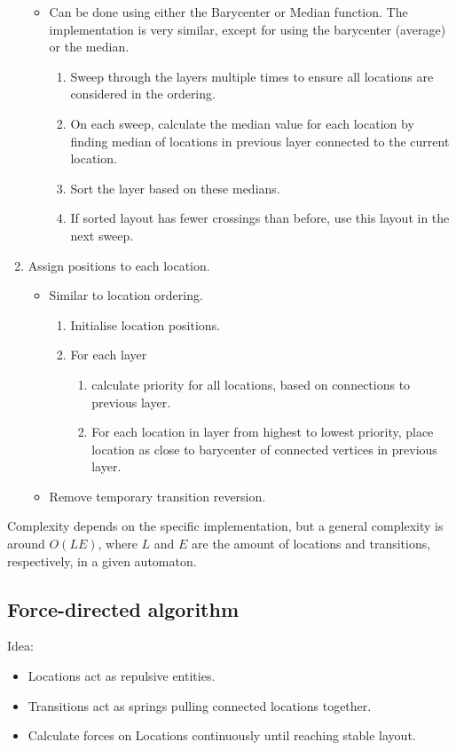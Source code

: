 \begin{enumerate}
\begin{itemize}
              \item Can be done using either the Barycenter or Median function. The implementation is very similar, except for using the barycenter (average) or the median.
                    \begin{enumerate}
                        \item Sweep through the layers multiple times to ensure all locations are considered in the ordering.
                        \item On each sweep, calculate the median value for each location by finding median of locations in previous layer connected to the current location.
                        \item Sort the layer based on these medians.
                        \item If sorted layout has fewer crossings than before, use this layout in the next sweep.
                    \end{enumerate}
          \end{itemize}
    \item Assign positions to each location.
          \begin{itemize}
              \item Similar to location ordering.
                    \begin{enumerate}
                        \item Initialise location positions.
                        \item For each layer
                              \begin{enumerate}
                                  \item calculate priority for all locations, based on connections to previous layer.
                                  \item For each location in layer from highest to lowest priority, place location as close to barycenter of connected vertices in previous layer.
                              \end{enumerate}
                    \end{enumerate}
              \item Remove temporary transition reversion.
          \end{itemize}
\end{enumerate}
\noindent
Complexity depends on the specific implementation, but a general complexity is around $O(LE)$, where $L$ and $E$ are the amount of locations and transitions, respectively, in a given automaton.

\subsection{Force-directed algorithm}

Idea:
\begin{itemize}
    \item Locations act as repulsive entities.
    \item Transitions act as springs pulling connected locations together.
    \item Calculate forces on Locations continuously until reaching stable layout.
\end{itemize}